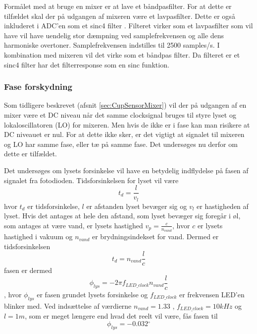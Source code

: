 \documentclass[HardwareDesign/HardwareDesign_main.tex]{subfiles}
\begin{document}
Formålet med at bruge en mixer er at lave et båndpasfilter. For at dette er tilfældet skal der på udgangen af mixeren være et lavpasfilter. Dette er også inkluderet i ADC'en som et sinc4 filter \autocite[35]{ADC_DelSig_datasheet}. Filteret virker som et lavpasfilter som vil have vil have uendelig stor dæmpning ved samplefrekvensen og alle dens harmoniske overtoner. Samplefrekvensen indstilles til 2500 samples/s. I kombination med mixeren vil det virke som et båndpas filter. Da filteret er et sinc4 filter har det filterresponse som en sinc funktion.

\subsubsection{Fase forskydning}
Som tidligere beskrevet (afsnit \ref{sec:CupSensorMixer}) vil der på udgangen af en mixer være et DC niveau når det samme clocksignal bruges til styre lyset og lokaloscillatoren (LO) for mixeren. Men hvis de ikke er i fase kan man risikere at DC niveauet er nul. For at dette ikke sker, er det vigtigt at signalet til mixeren og LO har samme fase, eller tæ på samme fase. Det undersøges nu derfor om dette er tilfældet.

Det undersøges om lysets forsinkelse vil have en betydelig indflydelse på fasen af signalet fra fotodioden. Tidsforsinkelsen for lyset vil være 
$$t_d = \frac{l}{v_l}$$
hvor $t_d$ er tidsforsinkelse, $l$ er afstanden lyset bevæger sig og $v_l$ er hastigheden af lyset. Hvis det antages at hele den afstand, som lyset bevæger sig foregår i øl, som antages at være vand, er lysets hastighed $v_p = \frac{c}{n_{vand}}$, hvor $c$ er lysets hastighed i vakuum og $n_{vand}$ er brydningsindekset for vand.
Dermed er tidsforsinkelsen
$$t_d = n_{vand}\frac{l}{c}$$
fasen er dermed
$$\phi_{lys} = -2 \pi f_{LED\_clock} n_{vand}\frac{l}{c}$$, hvor $\phi_{lys}$ er fasen grundet lysets forsinkelse og $f_{LED\_clock}$ er frekvensen LED'en blinker med. Ved indsættelse af værdierne $n_{vand}=1.33$ \autocite{brydningsindex}, $f_{LED\_clock} = 10kHz$ og $l=1m$, som er meget længere end hvad det reelt vil være, fås fasen til 
$$\phi_{lys} = -0.032 \si{^{\circ}}$$
\end{document}
